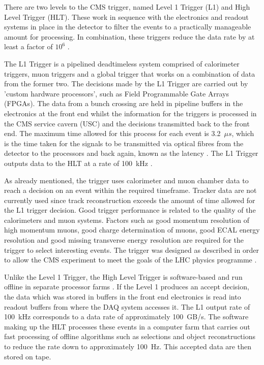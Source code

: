 There are two levels to the CMS trigger, named Level 1 Trigger (L1) and High Level Trigger (HLT). These work
in sequence with the electronics and readout systems in place in the detector to filter the events to a
practically manageable amount for processing. In combination, these triggers reduce the data rate by at least
a factor of $10^{6}$ \cite{CMS_experiment}.

The L1 Trigger is a pipelined deadtimeless system comprised of calorimeter triggers, muon triggers and a
global trigger that works on a combination of data from the former two. The decisions made by the L1 Trigger
are carried out by 'custom hardware processors', such as Field Programmable Gate Arrays (FPGAs). The data from
a bunch crossing are held in pipeline buffers in the electronics at the front end whilst the information for
the triggers is processed in the CMS service cavern (USC) and the decisions transmitted back to the front end.
The maximum time allowed for this process for each event is 3.2~$\mu s$, which is the time taken for the
signals to be transmitted via optical fibres from the detector to the processors and back again, known as the
latency \cite{CMS_TDR1}. The L1 Trigger outputs data to the HLT at a rate of 100~kHz \cite{CMS_experiment}.

As already mentioned, the trigger uses calorimeter and muon chamber data to reach a decision on an event
within the required timeframe. Tracker data are not currently used since track reconstruction exceeds the
amount of time allowed for the L1 trigger decision. Good trigger performance is related to the quality of the
calorimeters and muon systems. Factors such as good momentum resolution of high momentum muons, good charge
determination of muons, good ECAL energy resolution and good missing transverse energy resolution are required
for the trigger to select interesting events. The trigger was designed as described in order to allow the CMS
experiment to meet the goals of the LHC physics programme \cite{CMS_experiment}.

Unlike the Level 1 Trigger, the High Level Trigger is software-based and run offline in separate processor
farms \cite{CMS_TDR1}. If the Level 1 produces an accept decision, the data which was stored in buffers in the
front end electronics is read into readout buffers from where the DAQ system accesses it. The L1 output rate
of 100~kHz corresponds to a data rate of approximately 100~GB/s. The software making up the HLT processes
these events in a computer farm that carries out fast processing of offline algorithms such as selections and
object reconstructions to reduce the rate down to approximately 100~Hz. This accepted data are then stored on
tape.

